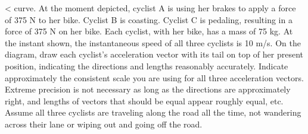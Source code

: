  <%
curve. At the moment depicted, cyclist A is using her brakes
to apply a force of 375 N to her bike.  Cyclist B is
coasting.  Cyclist C is pedaling, resulting in a force of
375 N on her bike.  Each cyclist, with her bike, has a
mass of 75 kg.  At the instant shown, the instantaneous
speed of all three cyclists is 10 m/s.  On the diagram, draw
each cyclist's acceleration vector with its tail on top of
her present position, indicating the directions and lengths
reasonably accurately.  Indicate approximately the
consistent scale you are using for all three acceleration
vectors.  Extreme precision is not necessary as long as the
directions are approximately right, and lengths of vectors
that should be equal appear roughly equal, etc.  Assume all
three cyclists are traveling along the road all the time,
not wandering across their lane or wiping out and going off the road.
